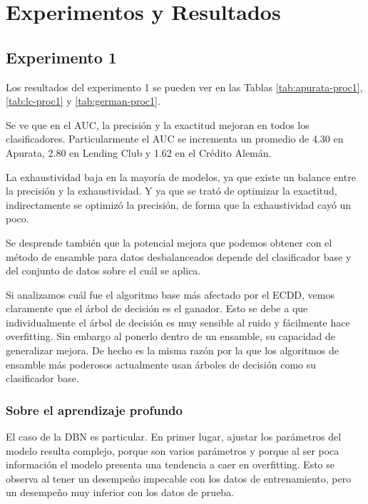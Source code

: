 \chapter{Experimentos y Resultados}

\section{Experimento 1} %

Los resultados del experimento 1 se pueden ver en las Tablas \ref{tab:apurata-proc1}, \ref{tab:lc-proc1} y \ref{tab:german-proc1}.

Se ve que en el \ac{AUC}, la precisión y la exactitud mejoran en todos los clasificadores. Particularmente el AUC se incrementa un promedio de 4.30 en Apurata, 2.80 en Lending Club y 1.62 en el Crédito Alemán.

La exhaustividad baja en la mayoría de modelos, ya que existe un balance entre la precisión y la exhaustividad. Y ya que se trató de optimizar la exactitud, indirectamente se optimizó la precisión, de forma que la exhaustividad cayó un poco.

Se desprende también que la potencial mejora que podemos obtener con el método de ensamble para datos desbalanceados depende del clasificador base y del conjunto de datos sobre el cuál se aplica.

Si analizamos cuál fue el algoritmo base más afectado por el \ac{ECDD}, vemos claramente que el árbol de decisión es el ganador. Esto se debe a que individualmente el árbol de decisión es muy sensible al ruido y fácilmente hace overfitting. Sin embargo al ponerlo dentro de un ensamble, su capacidad de generalizar mejora. De hecho es la misma razón por la que los algoritmos de ensamble más poderosos actualmente usan árboles de decisión como su clasificador base.

\subsection{Sobre el aprendizaje profundo}

El caso de la \ac{DBN} es particular. En primer lugar, ajustar los parámetros del modelo resulta complejo, porque son varios parámetros y porque al ser poca información el modelo presenta una tendencia a caer en overfitting. Esto se observa al tener un desempeño impecable con los datos de entrenamiento, pero un desempeño muy inferior con los datos de prueba.

